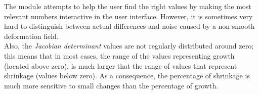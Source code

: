 The module attempts to help the user find the right values by making
the most relevant numbers interactive in the user interface. However,
it is sometimes very hard to distinguish between actual differences
and noise caused by a non smooth deformation field.\\

Also, the \textit{Jacobian determinant} values are not regularly
distributed around zero; this means that in most cases, the range of
the values representing growth (located above zero), is much larger
that the range of values that represent shrinkage (values below
zero). As a consequence, the percentage of shrinkage is much more
sensitive to small changes than the percentage of growth.
